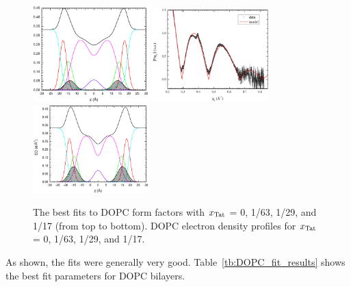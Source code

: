\begin{figure}[htbp]
  \includegraphics[width=0.4\textwidth]{figures/Tat/SDP_Results/EDP/DOPC_Tat_28to1_3p0_EDP1}
  \includegraphics[width=0.4\textwidth]{figures/Tat/SDP_Results/XFF/DOPC_Tat_16to1_3p0_XFF1}
  \includegraphics[width=0.4\textwidth]{figures/Tat/SDP_Results/EDP/DOPC_Tat_16to1_3p0_EDP1}
  \caption{The best fits to DOPC form factors with $x_\textrm{Tat}$ = 0, 1/63, 1/29, 
  and 1/17 (from top to bottom). DOPC electron density profiles for $x_\textrm{Tat}$ = 0, 1/63,
  1/29, and 1/17.}
  \label{fig:DOPC_Tat_XFF1}
\end{figure}
As shown, the fits were generally very good.  
Table~\ref{tb:DOPC_fit_results} shows the best fit parameters for DOPC bilayers.
